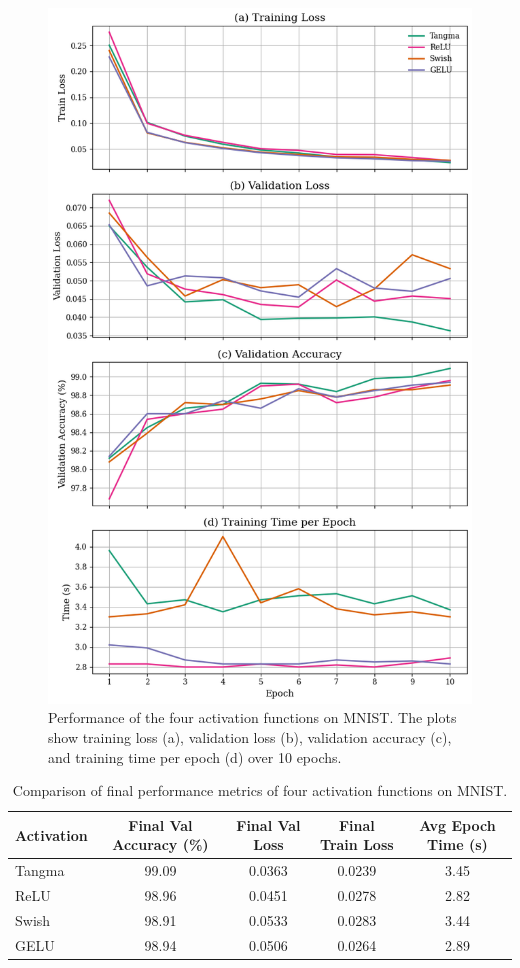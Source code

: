 \documentclass{article}
\begin{document}
\vspace{22pt}

\begin{figure}[H]
    \centering
    \includegraphics[width=0.6\linewidth]{mnist_data.png}
    \caption{Performance of the four activation functions on MNIST. The plots show training loss (a), validation loss (b), validation accuracy (c), and training time per epoch (d) over 10 epochs.}
    \label{fig:mnist-performance}
\end{figure}




\begin{table}[h]
\centering
\begin{tabular}{lcccc}
\toprule
Activation & Final Val Accuracy (\%) & Final Val Loss & Final Train Loss & Avg Epoch Time (s) \\
\midrule
Tangma & 99.09 & 0.0363 & 0.0239 & 3.45 \\
ReLU   & 98.96 & 0.0451 & 0.0278 & 2.82 \\
Swish  & 98.91 & 0.0533 & 0.0283 & 3.44 \\
GELU   & 98.94 & 0.0506 & 0.0264 & 2.89 \\
\bottomrule
\end{tabular}
\caption{Comparison of final performance metrics of four activation functions on MNIST.}
\label{tab:activation_results}
\end{table}
\end{document}
